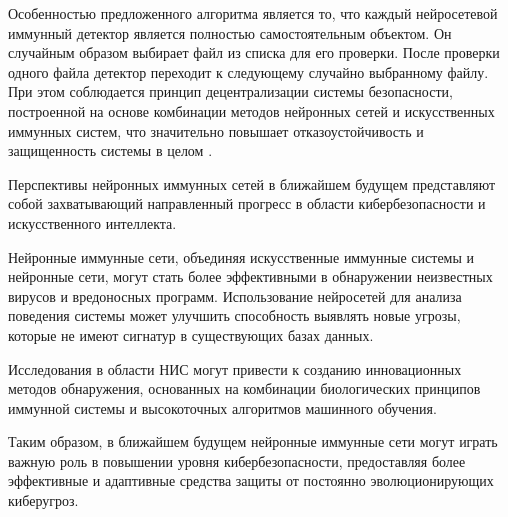 \documentclass[bachelor, och, referat]{template}
\begin{document}
Особенностью предложенного алгоритма является то, что каждый
нейросетевой иммунный детектор является полностью самостоятельным
объектом. Он случайным образом выбирает файл из списка для его проверки. 
После проверки одного файла детектор переходит к следующему
случайно выбранному файлу. При этом соблюдается принцип децентрализации 
системы безопасности, построенной на основе комбинации мето­дов 
нейронных сетей и искусственных иммунных систем, что значительно
повышает отказоустойчивость и защищенность системы в целом \cite{ais4}.

\conclusion

Перспективы нейронных иммунных сетей в ближайшем будущем представляют 
собой захватывающий направленный прогресс в области кибербезопасности и 
искусственного интеллекта.

Нейронные иммунные сети, объединяя искусственные иммунные системы и нейронные сети, 
могут стать более эффективными в обнаружении неизвестных вирусов 
и вредоносных программ. Использование нейросетей для анализа поведения 
системы может улучшить способность выявлять новые угрозы, которые 
не имеют сигнатур в существующих базах данных.

Исследования в области НИС могут привести к созданию инновационных методов 
обнаружения, основанных на комбинации биологических принципов иммунной системы 
и высокоточных алгоритмов машинного обучения.

Таким образом, в ближайшем будущем нейронные иммунные сети могут играть 
важную роль в повышении уровня кибербезопасности, предоставляя более 
эффективные и адаптивные средства защиты от постоянно эволюционирующих 
киберугроз.
\end{document}
